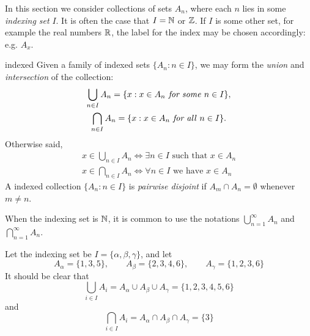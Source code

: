 In this section we consider collections of sets $A_n$, where each $n$ lies in some \emph{indexing set} $I$. It is often the case that $I=\mathbb{N}$ or $\mathbb{Z}$. If $I$ is some other set, for example the real numbers $\mathbb{R}$, the label for the index may be chosen accordingly: e.g. $A_x$.


\begin{defn}{}{indexed}
	Given a family of indexed sets $\{A_n:n\in I\}$, we may form the \emph{union} and \emph{intersection} of the collection:
	\begin{gather*}
		\bigcup_{n\in I}A_n=\{x:x\in A_n\text{\emph{ for some} }n\in I\},\\
		\bigcap_{n\in I}A_n=\{x:x\in A_n\text{\emph{ for all} }n\in I\}.
	\end{gather*}
	Otherwise said,
	\begin{gather*}
		x\in\bigcup_{n\in I}A_n\iff \exists n\in I\text{ such that }x\in A_n\\
		x\in\bigcap_{n\in I}A_n\iff \forall n\in I\text{ we have }x\in A_n
	\end{gather*}
	A indexed collection $\{A_n:n\in I\}$ is \emph{pairwise disjoint} if $A_m\cap A_n=\emptyset$ whenever $m\neq n$.
\end{defn}

When the indexing set is $\mathbb{N}$, it is common to use the notations $\bigcup\limits_{n=1}^\infty A_n$ and $\bigcap\limits_{n=1}^\infty A_n$.

\begin{example}{}{}
	Let the indexing set be $I=\{\alpha,\beta,\gamma\}$, and let
	\[
		A_\alpha=\{1,3,5\},\qquad A_\beta=\{2,3,4,6\},\qquad A_\gamma=\{1,2,3,6\}
	\]
	It should be clear that
	\[
		\bigcup_{i\in I}A_i=A_\alpha\cup A_\beta\cup A_\gamma=\{1,2,3,4,5,6\}
	\]
	and
	\[
		\bigcap_{i\in I}A_i=A_\alpha\cap A_\beta\cap A_\gamma=\{3\}
	\]
\end{example}

